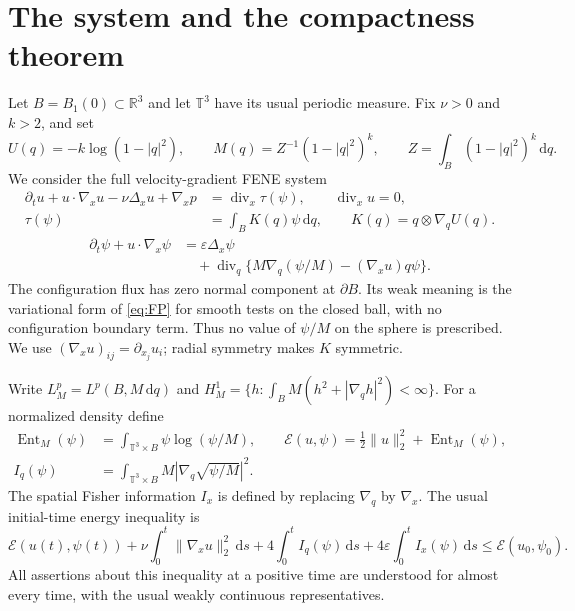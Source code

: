 \documentclass[11pt]{article}
\numberwithin{equation}{section}
\newcommand{\T}{\mathbb T^3}
\newcommand{\R}{\mathbb R}
\newcommand{\dd}{\,\mathrm d}
\newcommand{\Div}{\operatorname{div}}
\newcommand{\Ent}{\operatorname{Ent}_M}
\newcommand{\grad}{\nabla}
\begin{document}
\section{The system and the compactness theorem}\label{sec:theorem}
Let $B=B_1(0)\subset\R^3$ and let $\T$ have its usual periodic measure. Fix
$\nu>0$ and $k>2$, and set
\begin{equation}\label{eq:weight}
 U(q)=-k\log(1-|q|^2),\qquad
 M(q)=Z^{-1}(1-|q|^2)^k,\qquad Z=\int_B(1-|q|^2)^k\dd q.
\end{equation}
We consider the full velocity-gradient FENE system
\begin{align}
 \partial_tu+u\cdot\grad_xu-\nu\Delta_xu+\grad_xp
   &=\Div_x\tau(\psi),\qquad\Div_xu=0,\label{eq:NS}\\
 \tau(\psi)&=\int_B K(q)\psi\dd q,\qquad
 K(q)=q\otimes\grad_qU(q).\label{eq:stress}
\end{align}
\begin{equation}\label{eq:FP}
\begin{aligned}
 \partial_t\psi+u\cdot\grad_x\psi
   &=\varepsilon\Delta_x\psi\\
   &\quad+\Div_q\{M\grad_q(\psi/M)-(\grad_xu)q\psi\}.
\end{aligned}
\end{equation}
The configuration flux has zero normal component at $\partial B$. Its weak
meaning is the variational form of \eqref{eq:FP} for smooth tests on the closed
ball, with no configuration boundary term. Thus no value of $\psi/M$ on the
sphere is prescribed. We use $(\grad_xu)_{ij}=\partial_{x_j}u_i$; radial symmetry
makes $K$ symmetric.

Write $L^p_M=L^p(B,M\dd q)$ and
$H^1_M=\{h:\int_BM(h^2+|\grad_qh|^2)<\infty\}$. For a normalized density define
\begin{equation}\label{eq:energy}
\begin{aligned}
 \Ent(\psi)&=\int_{\T\times B}\psi\log(\psi/M),\qquad
 \mathcal E(u,\psi)=\tfrac12\|u\|_2^2+\Ent(\psi),\\
 I_q(\psi)&=\int_{\T\times B}M|\grad_q\sqrt{\psi/M}|^2.
\end{aligned}
\end{equation}
The spatial Fisher information $I_x$ is defined by replacing $\grad_q$ by
$\grad_x$. The usual initial-time energy inequality is
\begin{equation}\label{eq:entropy}
 \mathcal E(u(t),\psi(t))+\nu\int_0^t\|\grad_xu\|_2^2\dd s
 +4\int_0^t I_q(\psi)\dd s+4\varepsilon\int_0^t I_x(\psi)\dd s
 \leq \mathcal E(u_0,\psi_0).
\end{equation}
All assertions about this inequality at a positive time are understood for
almost every time, with the usual weakly continuous representatives.
\end{document}
